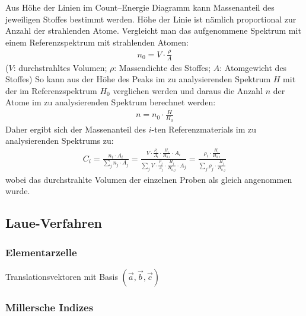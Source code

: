 \documentclass[10pt, a4paper]{article}
\begin{document}
Aus Höhe der Linien im Count--Energie Diagramm kann Massenanteil des jeweiligen Stoffes bestimmt werden.
Höhe der Linie ist nämlich proportional zur Anzahl der strahlenden Atome.
Vergleicht man das aufgenommene Spektrum mit einem Referenzspektrum mit strahlenden Atomen:
\begin{align}
  n_0 = V \cdot \frac{\rho}{A}
\end{align}
($V$: durchstrahltes Volumen; $\rho$: Massendichte des Stoffes; $A$: Atomgewicht des Stoffes)
So kann aus der Höhe des Peaks im zu analysierenden Spektrum $H$ mit der im Referenzspektrum $H_0$ verglichen werden und daraus die Anzahl $n$ der Atome im zu analysierenden Spektrum berechnet werden:
\begin{align}
  n = n_0 \cdot \frac{H}{H_0}
\end{align}
Daher ergibt sich der Massenanteil des $i$-ten Referenzmaterials im zu analysierenden Spektrums zu:
\begin{align}
  C_i = \frac{n_i \cdot A_i}{\sum_j n_j \cdot A_j} = \frac{V \cdot \frac{\rho_i}{A_i} \cdot \frac{H_i}{H_{0,i}} \cdot A_i}{\sum_j V \cdot \frac{\rho_j}{A_j} \cdot \frac{H_j}{H_{0,j}}\cdot A_j} = \frac{\rho_i \cdot \frac{H_i}{H_{0,i}}}{\sum_j \rho_j \cdot \frac{H_j}{H_{0,j}}}
\end{align}
wobei das durchstrahlte Volumen der einzelnen Proben als gleich angenommen wurde.

\subsection{Laue-Verfahren}

\subsubsection{Elementarzelle}
Translationsvektoren mit Basis $(\vec{a}, \vec{b}, \vec{c})$

\subsubsection{Millersche Indizes}
\end{document}
